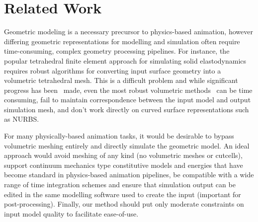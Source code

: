 \section{Related Work}

Geometric modeling is a necessary precursor to physics-based animation, however differing geometric representations for modelling and simulation often require
time-consuming, complex geometry processing pipelines. 
For instance, the popular tetrahedral finite element approach for simulating solid elastodynamics requires robust algorithms for converting input surface geometry into 
a volumetric tetrahedral mesh. This is a difficult problem and while significant progress has been~\cite{10.1145/2343483.2343501} made,
even the most robust volumetric methods~\cite{Hu:2018:TMW:3197517.3201353} can be time consuming, fail to maintain correspondence between the input model and output simulation mesh,
and don't work directly on curved surface representations such as NURBS.  


For many physically-based animation tasks, it would be desirable to bypass volumetric meshing entirely and directly simulate the geometric model.
An ideal approach would avoid meshing of any kind (no volumetric meshes or cutcells), support continuum mechanics type constitutive models 
and energies that have become standard in physics-based animation pipelines, be compatible with a wide range of time integration schemes and
ensure that simulation output can be edited in the same modelling software used to create the input (important for post-processing). 
Finally, our method should put only moderate constraints on input model quality to facilitate ease-of-use.

